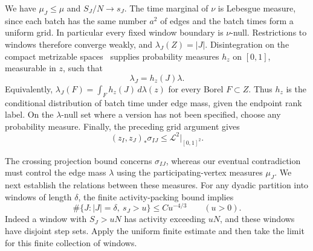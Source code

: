 We have $\mu_J\le\mu$ and $S_J/N\to s_J$.
The time marginal of $\nu$ is Lebesgue measure, since each batch has
the same number $a^2$ of edges and the batch times form a uniform grid.
In particular every fixed window boundary is $\nu$-null.  Restrictions
to windows therefore converge weakly, and $\lambda_J(Z)=|J|$.
Disintegration on the compact metrizable spaces~\cite[Example~2 and Theorem~3]{VianaRokhlin} supplies probability
measures $h_z$ on $[0,1]$, measurable in $z$, such that
\begin{equation}\label{eq:conditional-time}
 \lambda_J=h_z(J)\lambda.
\end{equation}
Equivalently, $\lambda_J(F)=\int_F h_z(J)\,d\lambda(z)$ for every
Borel $F\subset Z$. Thus $h_z$ is the conditional distribution of batch
time under edge mass, given the endpoint rank label.
On the $\lambda$-null set where a version has not been specified, choose
any probability measure.  Finally, the preceding grid argument gives
\begin{equation}\label{eq:crossing-projection}
 (z_I,z_J)_*\sigma_{IJ}\le\mathcal L^2\big|_{[0,1]^2}.
\end{equation}

The crossing projection bound concerns $\sigma_{IJ}$, whereas our
eventual contradiction must control the edge mass $\lambda$ using
the participating-vertex measures $\mu_J$. We next establish the
relations between these measures. For
any dyadic partition into windows of length $\delta$, the finite
activity-packing bound implies
\begin{equation}\label{eq:activity-tail}
 \#\{J: |J|=\delta,\ s_J>u\}\le C u^{-4/3}
 \qquad(u>0).
\end{equation}
Indeed a window with $S_J>uN$ has activity exceeding $uN$, and these
windows have disjoint step sets.  Apply the uniform finite estimate
and then take the limit for this finite collection of windows.

